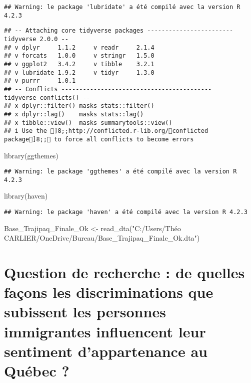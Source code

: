 \documentclass[
]{article}
\newenvironment{Shaded}{\begin{snugshade}}{\end{snugshade}}
\newcommand{\FunctionTok}[1]{\textcolor[rgb]{0.00,0.00,0.00}{#1}}
\newcommand{\NormalTok}[1]{#1}
\newcommand{\OtherTok}[1]{\textcolor[rgb]{0.56,0.35,0.01}{#1}}
\newcommand{\StringTok}[1]{\textcolor[rgb]{0.31,0.60,0.02}{#1}}
\begin{document}
\begin{verbatim}
## Warning: le package 'lubridate' a été compilé avec la version R 4.2.3
\end{verbatim}

\begin{verbatim}
## -- Attaching core tidyverse packages ------------------------ tidyverse 2.0.0 --
## v dplyr     1.1.2     v readr     2.1.4
## v forcats   1.0.0     v stringr   1.5.0
## v ggplot2   3.4.2     v tibble    3.2.1
## v lubridate 1.9.2     v tidyr     1.3.0
## v purrr     1.0.1     
## -- Conflicts ------------------------------------------ tidyverse_conflicts() --
## x dplyr::filter() masks stats::filter()
## x dplyr::lag()    masks stats::lag()
## x tibble::view()  masks summarytools::view()
## i Use the ]8;;http://conflicted.r-lib.org/conflicted package]8;; to force all conflicts to become errors
\end{verbatim}

\begin{Shaded}
\begin{Highlighting}[]
\FunctionTok{library}\NormalTok{(ggthemes)}
\end{Highlighting}
\end{Shaded}

\begin{verbatim}
## Warning: le package 'ggthemes' a été compilé avec la version R 4.2.3
\end{verbatim}

\begin{Shaded}
\begin{Highlighting}[]
\FunctionTok{library}\NormalTok{(haven)}
\end{Highlighting}
\end{Shaded}

\begin{verbatim}
## Warning: le package 'haven' a été compilé avec la version R 4.2.3
\end{verbatim}

\begin{Shaded}
\begin{Highlighting}[]
\NormalTok{Base\_Trajipaq\_Finale\_Ok }\OtherTok{\textless{}{-}} \FunctionTok{read\_dta}\NormalTok{(}\StringTok{"C:/Users/Théo CARLIER/OneDrive/Bureau/Base\_Trajipaq\_Finale\_Ok.dta"}\NormalTok{)}
\end{Highlighting}
\end{Shaded}

\hypertarget{question-de-recherche-de-quelles-fauxe7ons-les-discriminations-que-subissent-les-personnes-immigrantes-influencent-leur-sentiment-dappartenance-au-quuxe9bec}{%
\section{Question de recherche : de quelles façons les discriminations
que subissent les personnes immigrantes influencent leur sentiment
d'appartenance au Québec
?}\label{question-de-recherche-de-quelles-fauxe7ons-les-discriminations-que-subissent-les-personnes-immigrantes-influencent-leur-sentiment-dappartenance-au-quuxe9bec}}
\end{document}

